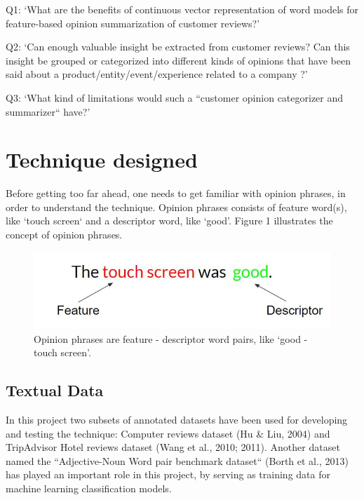 \documentclass{sig-alternate}
\begin{document}
Q1: `What are the benefits of continuous vector representation of word models for feature-based opinion summarization of customer reviews?'

Q2: `Can enough valuable insight be extracted from customer reviews? Can this insight be grouped or categorized into different kinds of opinions that have been said about a product/entity/event/experience related to a company ?'

Q3: `What kind of limitations would such a ``customer opinion categorizer and summarizer``  have?'

\section{Technique designed}
Before getting too far ahead, one needs to get familiar with opinion phrases, in order to understand the technique. Opinion phrases consists of feature word(s), like `touch screen` and a descriptor word, like `good'. Figure 1 illustrates the concept of opinion phrases. \\
\begin{figure}
\centering
\includegraphics[scale=0.65]{images/FD_words.JPG}
\caption{Opinion phrases are feature - descriptor word pairs, like `good - touch screen'.}
\end{figure}

\subsection{Textual Data}
In this project two subsets of annotated datasets have been used for developing and testing the technique: Computer reviews dataset (Hu \& Liu, 2004) and TripAdvisor Hotel reviews dataset (Wang et al., 2010; 2011). Another dataset named the ``Adjective-Noun Word pair benchmark dataset``  (Borth et al., 2013) has played an important role in this project, by serving as training data for machine learning classification models.
\end{document}
